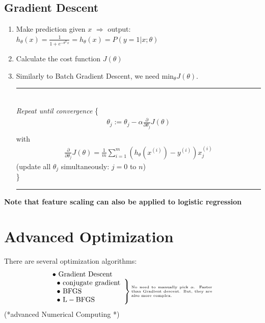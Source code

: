 \documentclass[a4paper,12pt]{report}
\begin{document}
\subsection{Gradient Descent}
\begin{enumerate}
\item Make prediction given $x$ $\Rightarrow$ output: $h_{\theta}(x) = \frac{1}{1+e^{-\theta^{\mathrm{T}}x}} = h_{\theta}(x) = P(y=1|x;\theta)$
\item Calculate the cost function $J(\theta)$
\item Similarly to Batch Gradient Descent, we need $\mathrm{min}_{\theta} J(\theta)$. \\
\noindent\rule{\linewidth}{0.4pt} 
\\ \textit{Repeat until convergence} \{
\begin{align*}
\theta_j  := \theta_j - \alpha \frac{\partial}{\partial \theta_j} J(\theta)\\
\end{align*}
with
\begin{align*}
\frac{\partial}{\partial \theta_j} J(\theta) = \frac{1}{m} \sum_{i=1} ^m \left(h_{\theta}(x^{(i)})-y^{(i)}\right) x_j ^{(i)}
\end{align*}
(update all $\theta_j$ simultaneously: $j = 0$ to $n$)\\
\} \\
\noindent\rule{\linewidth}{0.4pt}
\end{enumerate}

\textbf{Note that feature scaling can also be applied to logistic regression}
\section{Advanced Optimization}
There are several optimization algorithms:
\begin{align*}
\begin{array}{ll}
    \bullet \ \mathrm{Gradient \ Descent} \\
		\left.
		\begin{array}{ll}
					\bullet \ \mathrm{conjugate \  gradient}\\
					\bullet \ \mathrm{BFGS}\\
					\bullet \ \mathrm{L-BFGS}
		\end{array}
		\right\} \parbox{4cm}{\tiny{No need to manually pick $\alpha$. Faster than Gradient descent. But, they are also more complex.}}
\end{array}
\end{align*}
(*advanced Numerical Computing *)
\end{document}
